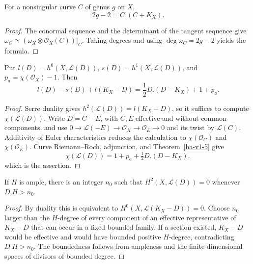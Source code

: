 \begin{proposition}
\label{ha-v1-5}
For a nonsingular curve \(C\) of genus \(g\) on \(X\),
\[
 2g-2=C.(C+K_X).
\]

\end{proposition}
\begin{proof}
The conormal sequence and the determinant of the tangent sequence give
\(\omega_C\simeq(\omega_X\otimes\mathcal O_X(C))|_C\).  Taking degrees and
using \(\deg\omega_C=2g-2\) yields the formula.
\end{proof}

\begin{theorem}
\label{ha-v1-6}
Put \(l(D)=h^0(X,\mathcal L(D))\), \(s(D)=h^1(X,\mathcal L(D))\), and
\(p_a=\chi(\mathcal O_X)-1\).  Then
\[
 l(D)-s(D)+l(K_X-D)=\frac12D.(D-K_X)+1+p_a.
\]
\end{theorem}
\begin{proof}
Serre duality gives \(h^2(\mathcal L(D))=l(K_X-D)\), so it suffices to
compute \(\chi(\mathcal L(D))\).  Write \(D=C-E\), with \(C,E\) effective
and without common components, and use
\(0\to\mathcal L(-E)\to\mathcal O_X\to\mathcal O_E\to0\) and its twist by
\(\mathcal L(C)\).  Additivity of Euler characteristics reduces the calculation
to \(\chi(\mathcal O_C)\) and \(\chi(\mathcal O_E)\).  Curve Riemann--Roch,
adjunction, and Theorem~\ref{ha-v1-5} give
\[
 \chi(\mathcal L(D))=1+p_a+\tfrac12D.(D-K_X),
\]
which is the assertion.
\end{proof}

\begin{lemma}
\label{ha-v1-7}
If \(H\) is ample, there is an integer \(n_0\) such that
\(H^2(X,\mathcal L(D))=0\) whenever \(D.H>n_0\).

\end{lemma}
\begin{proof}
By duality this is equivalent to
\(H^0(X,\mathcal L(K_X-D))=0\).  Choose \(n_0\) larger than the \(H\)-degree
of every component of an effective representative of \(K_X-D\) that can
occur in a fixed bounded family.  If a section existed, \(K_X-D\) would be
effective and would have bounded positive \(H\)-degree, contradicting
\(D.H>n_0\).  The boundedness follows from ampleness and the finite-dimensional
spaces of divisors of bounded degree.
\end{proof}

